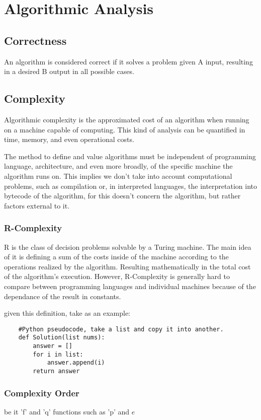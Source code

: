 \documentclass[12pt,a4paper,red]{bbe}
\begin{document}
			
	\chapter{Algorithmic Analysis}
	\section{Correctness}
	An algorithm is considered correct if it solves a problem given A input, resulting in a desired B output in all possible cases.

	\section{Complexity}
	Algorithmic complexity is the approximated cost of an algorithm when running on a machine capable of computing. This kind of analysis can be quantified in time, memory, and even operational costs.

	\begin{remark}
	The method to define and value algorithms must be independent of programming language, architecture, and even more broadly, of the specific machine the algorithm runs on. This implies we don't take into account computational problems, such as compilation or, in interpreted languages, the interpretation into bytecode of the algorithm, for this doesn't concern the algorithm, but rather factors external to it.   
	\end{remark}

	\subsection{R-Complexity}
	R is the class of decision problems solvable by a Turing machine. The main idea of it is defining a sum of the costs inside of the machine according to the operations realized by the algorithm. Resulting mathematically in the total cost of the algorithm's execution. However, R-Complexity is generally hard to compare between programming languages and individual machines because of the dependance of the result in constants.

	given this definition, take as an example:

	\begin{verbatim}
	#Python pseudocode, take a list and copy it into another.
	def Solution(list nums):
		answer = []
		for i in list:
			answer.append(i)
		return answer
	\end{verbatim}

	\subsection{Complexity Order}
	be it 'f' and 'q' functions such as 'p' and $e$
 \blinddocument
 
\end{document}
